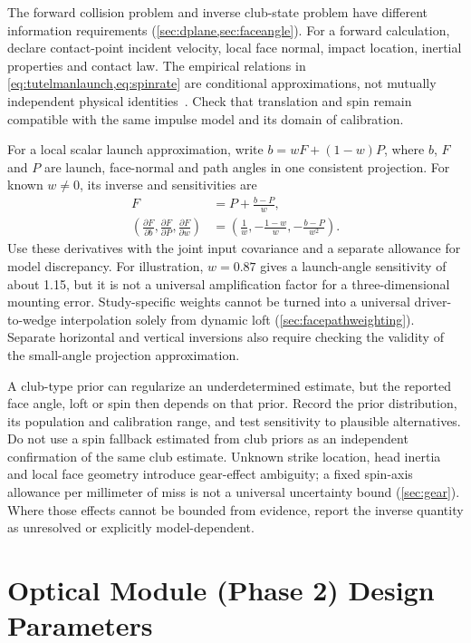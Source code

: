 The forward collision problem and inverse club-state problem have different information requirements (\cref{sec:dplane,sec:faceangle}).
For a forward calculation, declare contact-point incident velocity, local face normal, impact location, inertial properties and contact law.
The empirical relations in \cref{eq:tutelmanlaunch,eq:spinrate} are conditional approximations, not mutually independent physical identities~\cite{tutelman3d}.
Check that translation and spin remain compatible with the same impulse model and its domain of calibration.

For a local scalar launch approximation, write $b=wF+(1-w)P$, where $b$, $F$ and $P$ are launch, face-normal and path angles in one consistent projection.
For known $w\ne0$, its inverse and sensitivities are
\begin{align}
F&=P+\frac{b-P}{w},\label{eq:implfaceinverse}\\
\left(\frac{\partial F}{\partial b},\frac{\partial F}{\partial P},
\frac{\partial F}{\partial w}\right)
&=\left(\frac1w,-\frac{1-w}{w},-\frac{b-P}{w^2}\right).
\label{eq:implfacesensitivity}
\end{align}
Use these derivatives with the joint input covariance and a separate allowance for model discrepancy.
For illustration, $w=0.87$ gives a launch-angle sensitivity of about 1.15, but it is not a universal amplification factor for a three-dimensional mounting error.
Study-specific weights cannot be turned into a universal driver-to-wedge interpolation solely from dynamic loft (\cref{sec:facepathweighting}).
Separate horizontal and vertical inversions also require checking the validity of the small-angle projection approximation.

A club-type prior can regularize an underdetermined estimate, but the reported face angle, loft or spin then depends on that prior.
Record the prior distribution, its population and calibration range, and test sensitivity to plausible alternatives.
Do not use a spin fallback estimated from club priors as an independent confirmation of the same club estimate.
Unknown strike location, head inertia and local face geometry introduce gear-effect ambiguity; a fixed spin-axis allowance per millimeter of miss is not a universal uncertainty bound (\cref{sec:gear}).
Where those effects cannot be bounded from evidence, report the inverse quantity as unresolved or explicitly model-dependent.

\section{Optical Module (Phase 2) Design Parameters}
\label{app:optical}

